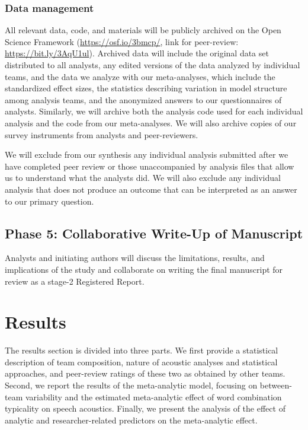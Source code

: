 \documentclass[Review,times,sageh]{sagej}
\begin{document}
\hypertarget{ana-archive}{%
\subsubsection{Data management}\label{ana-archive}}

All relevant data, code, and materials will be publicly archived on the Open Science Framework (\url{https://osf.io/3bmcp/}, link for peer-review: \url{https://bit.ly/3AqU1ul}).
Archived data will include the original data set distributed to all analysts, any edited versions of the data analyzed by individual teams, and the data we analyze with our meta-analyses, which include the standardized effect sizes, the statistics describing variation in model structure among analysis teams, and the anonymized answers to our questionnaires of analysts.
Similarly, we will archive both the analysis code used for each individual analysis and the code from our meta-analyses.
We will also archive copies of our survey instruments from analysts and peer-reviewers.

We will exclude from our synthesis any individual analysis submitted after we have completed peer review or those unaccompanied by analysis files that allow us to understand what the analysts did.
We will also exclude any individual analysis that does not produce an outcome that can be interpreted as an answer to our primary question.

\hypertarget{phase-5-collaborative-write-up-of-manuscript}{%
\subsection{Phase 5: Collaborative Write-Up of Manuscript}\label{phase-5-collaborative-write-up-of-manuscript}}

Analysts and initiating authors will discuss the limitations, results, and implications of the study and collaborate on writing the final manuscript for review as a stage-2 Registered Report.

\hypertarget{results}{%
\section{Results}\label{results}}

The results section is divided into three parts.
We first provide a statistical description of team composition, nature of acoustic analyses and statistical approaches, and peer-review ratings of these two as obtained by other teams.
Second, we report the results of the meta-analytic model, focusing on between-team variability and the estimated meta-analytic effect of word combination typicality on speech acoustics.
Finally, we present the analysis of the effect of analytic and researcher-related predictors on the meta-analytic effect.
\end{document}
